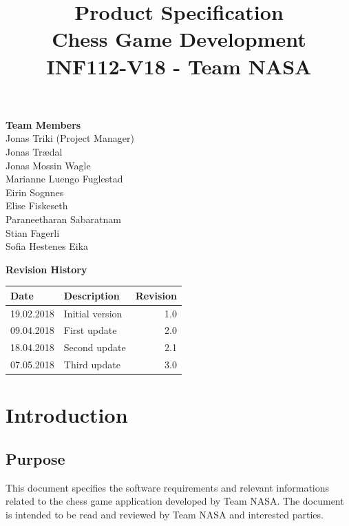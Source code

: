 \documentclass{article}
\title{Product Specification\\
		Chess Game Development\\
		INF112-V18 - Team NASA}
\author{}
\date{}
\begin{document}
\maketitle
	
\begin{center}
	\textbf{Team Members}\\
	Jonas Triki (Project Manager)\\
	Jonas Trædal\\	
	Jonas Mossin Wagle \\
	Marianne Luengo Fuglestad \\
	Eirin Sognnes\\
	Elise Fiskeseth\\
	Paraneetharan Sabaratnam\\
	Stian Fagerli\\
	Sofia Hestenes Eika\\	
\end{center}

\vspace{20mm}	

\begin{center}
	\textbf{Revision History}\\
	\begin{tabular}[b!]{|l|l|r|}
		\hline
		Date\hspace{2cm} & Description\hspace{5cm} & Revision \\
		\hline
		19.02.2018 & Initial version & 1.0 \\
		\hline
		09.04.2018 & First update & 2.0 \\
		\hline
		18.04.2018 & Second update & 2.1 \\
		\hline
		07.05.2018 & Third update & 3.0 \\		
		\hline
	\end{tabular}
\end{center}

\newpage
\tableofcontents
\newpage

\section{Introduction}
\subsection{Purpose}
	This document specifies the software requirements and relevant informations related to the chess game application developed by Team NASA. The document is intended to be read and reviewed by Team NASA and interested parties.
\end{document}
